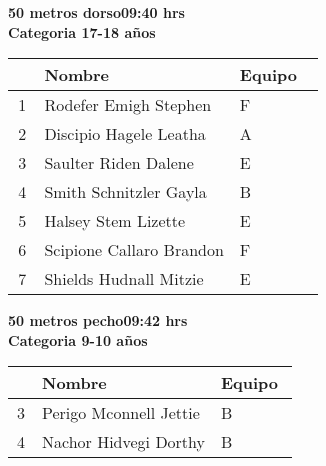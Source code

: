 \begin{minipage}{0.95\linewidth}\vspace{0.5cm} 
\begin{flushleft}
\textbf{
\hspace{-0.15cm}50 metros dorso\hspace{1.5cm}09:40 hrs \\Categoria 17-18 años}\vspace{-0.2cm} 
\end{flushleft}
\begin{tabular}{cp{0.63\linewidth}l}
\hline
& \textbf{Nombre} & \textbf{Equipo} \\ \hline
1 & Rodefer Emigh Stephen & F \\ 
2 & Discipio Hagele Leatha & A \\ 
3 & Saulter Riden Dalene & E \\ 
4 & Smith Schnitzler Gayla & B \\ 
5 & Halsey Stem Lizette & E \\ 
6 & Scipione Callaro Brandon & F \\ 
7 & Shields Hudnall Mitzie & E \\ 
\end{tabular}
\end{minipage}
\begin{minipage}{0.95\linewidth}\vspace{0.5cm} 
\begin{flushleft}
\textbf{
\hspace{-0.15cm}50 metros pecho\hspace{1.5cm}09:42 hrs \\Categoria 9-10 años}\vspace{-0.2cm} 
\end{flushleft}
\begin{tabular}{cp{0.63\linewidth}l}
\hline
& \textbf{Nombre} & \textbf{Equipo} \\ \hline
3 & Perigo Mconnell Jettie & B \\ 
4 & Nachor Hidvegi Dorthy & B \\ 
\end{tabular}
\end{minipage}
